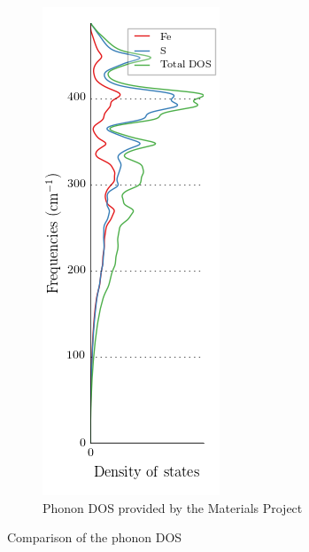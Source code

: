 \documentclass[11pt,a4paper]{article}
\begin{document}
\begin{figure}
\hfill
\begin{subfigure}[b]{0.35\textwidth}
\centering
\includegraphics[width=\textwidth]{images/phonon_dos.png}
\caption{Phonon DOS provided by the Materials Project}
\label{fig:phonondos2}
\end{subfigure}
\caption{Comparison of the phonon DOS}
\label{fig:phonondos}
\end{figure}
\end{document}
